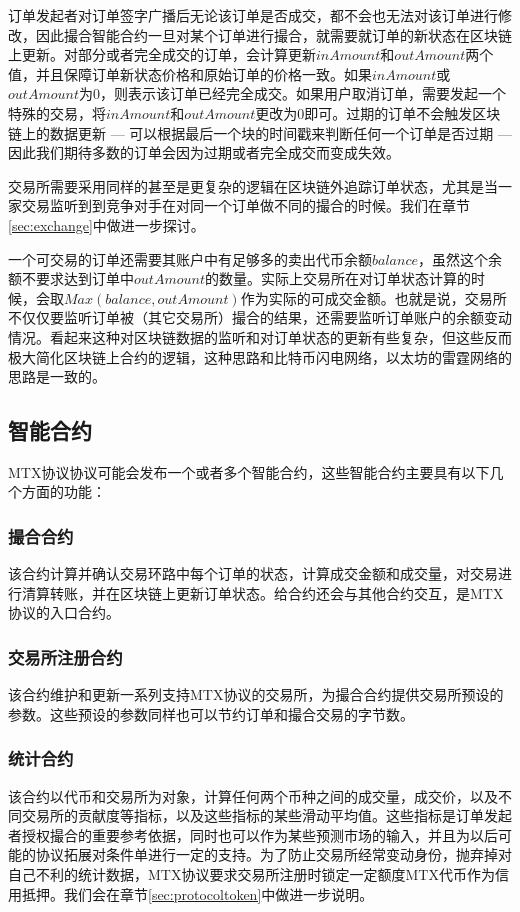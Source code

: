 \documentclass[UTF8,nofonts]{ctexart}
\begin{document}
订单发起者对订单签字广播后无论该订单是否成交，都不会也无法对该订单进行修改，因此撮合智能合约一旦对某个订单进行撮合，就需要就订单的新状态在区块链上更新。对部分或者完全成交的订单，会计算更新$inAmount$和$outAmount$两个值，并且保障订单新状态价格和原始订单的价格一致。如果$inAmount$或$outAmount$为0，则表示该订单已经完全成交。如果用户取消订单，需要发起一个特殊的交易，将$inAmount$和$outAmount$更改为0即可。过期的订单不会触发区块链上的数据更新 --- 可以根据最后一个块的时间戳来判断任何一个订单是否过期 --- 因此我们期待多数的订单会因为过期或者完全成交而变成失效。

交易所需要采用同样的甚至是更复杂的逻辑在区块链外追踪订单状态，尤其是当一家交易监听到到竞争对手在对同一个订单做不同的撮合的时候。我们在章节\ref{sec:exchange}中做进一步探讨。

一个可交易的订单还需要其账户中有足够多的卖出代币余额$balance$，虽然这个余额不要求达到订单中$outAmount$的数量。实际上交易所在对订单状态计算的时候，会取$Max(balance, outAmount)$作为实际的可成交金额。也就是说，交易所不仅仅要监听订单被（其它交易所）撮合的结果，还需要监听订单账户的余额变动情况。看起来这种对区块链数据的监听和对订单状态的更新有些复杂，但这些反而极大简化区块链上合约的逻辑，这种思路和比特币闪电网络，以太坊的雷霆网络的思路是一致的。


\subsection{智能合约\label{sec:contracts}}

MTX协议协议可能会发布一个或者多个智能合约，这些智能合约主要具有以下几个方面的功能：

\subsubsection{撮合合约} 

该合约计算并确认交易环路中每个订单的状态，计算成交金额和成交量，对交易进行清算转账，并在区块链上更新订单状态。给合约还会与其他合约交互，是MTX协议的入口合约。

\subsubsection{交易所注册合约}
该合约维护和更新一系列支持MTX协议的交易所，为撮合合约提供交易所预设的参数。这些预设的参数同样也可以节约订单和撮合交易的字节数。

\subsubsection{统计合约} 该合约以代币和交易所为对象，计算任何两个币种之间的成交量，成交价，以及不同交易所的贡献度等指标，以及这些指标的某些滑动平均值。这些指标是订单发起者授权撮合的重要参考依据，同时也可以作为某些预测市场的输入，并且为以后可能的协议拓展对条件单进行一定的支持。为了防止交易所经常变动身份，抛弃掉对自己不利的统计数据，MTX协议要求交易所注册时锁定一定额度MTX代币作为信用抵押。我们会在章节\ref{sec:protocoltoken}中做进一步说明。
\end{document}

